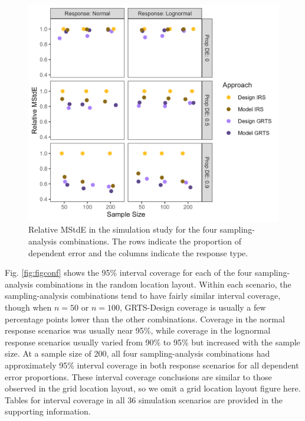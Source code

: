 \documentclass[]{elsarticle} %
\begin{document}
\begin{figure}
  \centering
  \includegraphics[width = 1\linewidth]{figures/mse_eff.jpeg}
  \caption{Relative MStdE in the simulation study for the four sampling-analysis combinations. The rows indicate the proportion of dependent error and the columns indicate the response type.}
  \label{fig:mse_eff}
\end{figure}

Fig. \ref{fig:figconf} shows the 95\% interval coverage for each of the
four sampling-analysis combinations in the random location layout.
Within each scenario, the sampling-analysis combinations tend to have
fairly similar interval coverage, though when \(n = 50\) or \(n = 100\),
GRTS-Design coverage is usually a few percentage points lower than the
other combinations. Coverage in the normal response scenarios was
usually near 95\%, while coverage in the lognormal response scenarios
usually varied from 90\% to 95\% but increased with the sample size. At
a sample size of 200, all four sampling-analysis combinations had
approximately 95\% interval coverage in both response scenarios for all
dependent error proportions. These interval coverage conclusions are
similar to those observed in the grid location layout, so we omit a grid
location layout figure here. Tables for interval coverage in all 36
simulation scenarios are provided in the supporting information.
\end{document}
